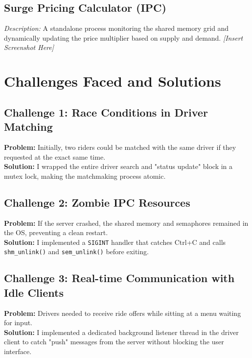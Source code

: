 \documentclass[12pt]{article}
\begin{document}
\subsection{Surge Pricing Calculator (IPC)}
\textit{Description:} A standalone process monitoring the shared memory grid and dynamically updating the price multiplier based on supply and demand.
\textit{[Insert Screenshot Here]}

\section{Challenges Faced and Solutions}

\subsection{Challenge 1: Race Conditions in Driver Matching}
\textbf{Problem:} Initially, two riders could be matched with the same driver if they requested at the exact same time. \\
\textbf{Solution:} I wrapped the entire driver search and "status update" block in a mutex lock, making the matchmaking process atomic.

\subsection{Challenge 2: Zombie IPC Resources}
\textbf{Problem:} If the server crashed, the shared memory and semaphores remained in the OS, preventing a clean restart. \\
\textbf{Solution:} I implemented a \texttt{SIGINT} handler that catches Ctrl+C and calls \texttt{shm\_unlink()} and \texttt{sem\_unlink()} before exiting.

\subsection{Challenge 3: Real-time Communication with Idle Clients}
\textbf{Problem:} Drivers needed to receive ride offers while sitting at a menu waiting for input. \\
\textbf{Solution:} I implemented a dedicated background listener thread in the driver client to catch "push" messages from the server without blocking the user interface.
\end{document}
